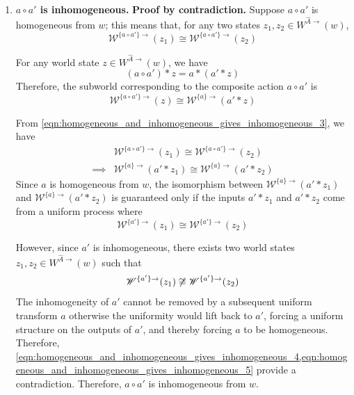 \begin{proofE}
\begin{enumerate}
    \item \textbf{$a \circ a'$ is inhomogeneous.}
    \textbf{Proof by contradiction.}
    Suppose $a \circ a'$ is homogeneous from $w$; this means that, for any two states $z_{1}, z_{2} \in W^{\hat{A}\to}(w)$,
    \begin{equation}
        \mathscr{W}^{\{a \circ a'\}\to}(z_{1}) \cong \mathscr{W}^{\{a \circ a'\}\to}(z_{2})
    \end{equation}
    
    For any world state $z \in W^{\hat{A}\to}(w)$, we have
    \begin{equation}
        (a \circ a') \ast z = a \ast (a' \ast z)
    \end{equation}
    Therefore, the subworld corresponding to the composite action $a \circ a'$ is
    \begin{equation}
    \label{eqn:homogeneous_and_inhomogeneous_gives_inhomogeneous_3}
        \mathscr{W}^{\{a \circ a'\}\to}(z) \cong \mathscr{W}^{\{a\}\to}(a' \ast z)
    \end{equation}

    From \cref{eqn:homogeneous_and_inhomogeneous_gives_inhomogeneous_3}, we have
    \begin{align}
        & \mathscr{W}^{\{a \circ a'\}\to}(z_{1}) \cong \mathscr{W}^{\{a \circ a'\}\to}(z_{2}) \\
        \implies & \mathscr{W}^{\{a\}\to}(a' \ast z_{1}) \cong \mathscr{W}^{\{a\}\to}(a' \ast z_{2})
    \end{align}
    Since $a$ is homogeneous from $w$, the isomorphism between $\mathscr{W}^{\{a\}\to}(a' \ast z_{1})$ and $\mathscr{W}^{\{a\}\to}(a' \ast z_{2})$ is guaranteed only if the inputs $a' \ast z_{1}$ and $a' \ast z_{2}$ come from a uniform process where
    \begin{equation}
    \label{eqn:homogeneous_and_inhomogeneous_gives_inhomogeneous_4}
        \mathscr{W}^{\{a'\}\to}(z_{1}) \cong \mathscr{W}^{\{a'\}\to}(z_{2})
    \end{equation}

    However, since $a'$ is inhomogeneous, there exists two world states $z_{1}, z_{2} \in W^{\hat{A}\to}(w)$ such that
    \begin{equation}
    \label{eqn:homogeneous_and_inhomogeneous_gives_inhomogeneous_5}
        \mathscr{W}^{\{a'\}\to}(z_{1}) \centernot\cong \mathscr{W}^{\{a'\}\to}(z_{2})
    \end{equation}
    The inhomogeneity of $a'$ cannot be removed by a subsequent uniform transform $a$ otherwise the uniformity would lift back to $a'$, forcing a uniform structure on the outputs of $a'$, and thereby forcing $a$ to be homogeneous.
    Therefore, \cref{eqn:homogeneous_and_inhomogeneous_gives_inhomogeneous_4,eqn:homogeneous_and_inhomogeneous_gives_inhomogeneous_5} provide a contradiction.
    Therefore, $a \circ a'$ is inhomogeneous from $w$.
\end{enumerate}
\end{proofE}


